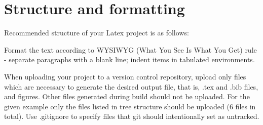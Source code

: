 \section{Structure and formatting}
\label{sec:structure}
 
Recommended structure of your Latex project is as follows: 


Format the text according to WYSIWYG (What You See Is What You Get) rule - separate paragraphs with a blank line; indent items in tabulated environments.

When uploading your project to a version control repository, upload only files which are necessary to 
generate the desired output file, that is, .tex and .bib files, and figures. Other files generated during build should not be uploaded. For the given example only the files listed in tree structure should be uploaded (6 files in total). Use .gitignore to specify files that git should intentionally set as untracked. 


